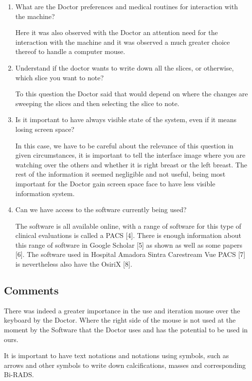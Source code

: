 \begin{enumerate}
  \item What are the Doctor preferences and medical routines for interaction with the machine?
  
  Here it was also observed with the Doctor an attention need for the interaction with the machine and it was observed a much greater choice thereof to handle a computer mouse.
  
  \item Understand if the doctor wants to write down all the slices, or otherwise, which slice you want to note?
  
  To this question the Doctor said that would depend on where the changes are sweeping the slices and then selecting the slice to note.
  
  \item Is it important to have always visible state of the system, even if it means losing screen space?
  
   In this case, we have to be careful about the relevance of this question in given circumstances, it is important to tell the interface image where you are watching over the others and whether it is right breast or the left breast. The rest of the information it seemed negligible and not useful, being most important for the Doctor gain screen space face to have less visible information system.
  
  \item Can we have access to the software currently being used?
  
  The software is all available online, with a range of software for this type of clinical evaluations is called a PACS [4]. There is enough information about this range of software in Google Scholar [5] as shown as well as some papers [6]. The software used in Hospital Amadora Sintra Carestream Vue PACS [7] is nevertheless also have the OsiriX [8].

\end{enumerate}

\subsection{Comments}

There was indeed a greater importance in the use and iteration mouse over the keyboard by the Doctor. Where the right side of the mouse is not used at the moment by the Software that the Doctor uses and has the potential to be used in ours.

It is important to have text notations and notations using symbols, such as arrows and other symbols to write down calcifications, masses and corresponding Bi-RADS.

